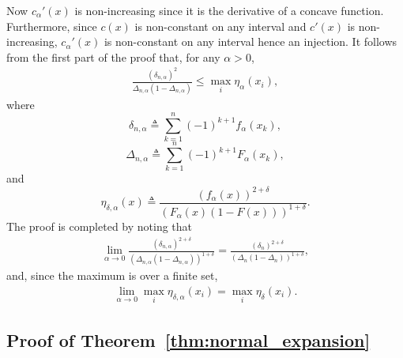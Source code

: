 Now $c_\alpha'(x)$ is non-increasing since it is the derivative of a concave function. Furthermore, since $c(x)$ is non-constant on any interval and $c'(x)$ is non-increasing, $c_\alpha'(x)$ is non-constant on any interval hence an injection. It follows from the first part of the proof that, for any $\alpha>0$,
\begin{align}
\label{eq:proof:lem:bound_intervals}
\frac{(\delta_{n,\alpha})^2}{\Delta_{n,\alpha}(1-\Delta_{n,\alpha})} \leq \max_i \eta_{\alpha}(x_i),
\end{align}
where 
\[
\delta_{n,\alpha} \triangleq  \sum_{k=1}^{n} (-1)^{k+1} f_{\alpha}(x_k),
\]
\[
\Delta_{n,\alpha} \triangleq \sum_{k=1}^n (-1)^{k+1} F_{\alpha}(x_k), 
\]
and 
\[
\eta_{\delta,\alpha}(x) \triangleq \frac{(f_\alpha(x))^{2+\delta}}{\left(F_{\alpha}(x)(1-F(x)) \right)^{1+\delta}}. 
\]
The proof is completed by noting that 
\begin{align*}
\lim_{\alpha \to 0} \frac{(\delta_{n,\alpha})^{2+\delta} }{ \left(\Delta_{n,\alpha}(1-\Delta_{n,\alpha})\right)^{1+\delta}}  = \frac{(\delta_{n})^{2+\delta }}{\left(\Delta_{n}(1-\Delta_{n}) \right)^{1+\delta}},  
\end{align*}
and, since the maximum is over a finite set,
\begin{align*}
\lim_{\alpha \to 0}  \max_i \eta_{\delta,\alpha}(x_i)  = \max_i\eta_\delta(x_i).
\end{align*}




\QEDA 


\subsection{Proof of Theorem~\ref{thm:normal_expansion}
\label{proof:thm:normal_expansion}
}
